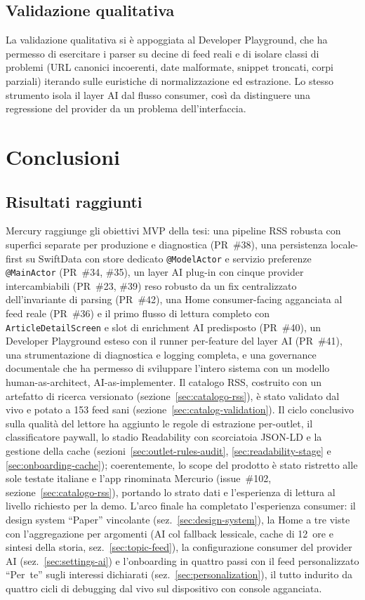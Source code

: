 \section{Validazione qualitativa}
La validazione qualitativa si è appoggiata al Developer Playground, che
ha permesso di esercitare i parser su decine di feed reali e di isolare
classi di problemi (URL canonici incoerenti, date malformate, snippet
troncati, corpi parziali) iterando sulle euristiche di normalizzazione ed
estrazione. Lo stesso strumento isola il layer AI dal flusso consumer,
così da distinguere una regressione del provider da un problema
dell'interfaccia.

\chapter{Conclusioni}
\label{cap:conclusioni}

\section{Risultati raggiunti}
Mercury raggiunge gli obiettivi MVP della tesi: una pipeline RSS robusta con
superfici separate per produzione e diagnostica (PR~\#38), una persistenza
locale-first su SwiftData con store dedicato \texttt{@ModelActor} e servizio
preferenze \texttt{@MainActor} (PR~\#34, \#35), un layer AI plug-in con
cinque provider intercambiabili (PR~\#23, \#39) reso robusto da un fix
centralizzato dell'invariante di parsing (PR~\#42), una Home
consumer-facing agganciata al feed reale (PR~\#36) e il primo flusso di
lettura completo con \texttt{ArticleDetailScreen} e slot di enrichment AI
predisposto (PR~\#40), un Developer Playground esteso con il runner
per-feature del layer AI (PR~\#41), una strumentazione di diagnostica e
logging completa, e una governance documentale che ha permesso di
sviluppare l'intero sistema con un modello human-as-architect,
AI-as-implementer. Il catalogo RSS, costruito con un artefatto di
ricerca versionato (sezione~\ref{sec:catalogo-rss}), è stato validato
dal vivo e potato a 153 feed sani
(sezione~\ref{sec:catalog-validation}). Il ciclo conclusivo sulla
qualità del lettore ha aggiunto le regole di estrazione per-outlet,
il classificatore paywall, lo stadio Readability con scorciatoia
JSON-LD e la gestione della cache
(sezioni~\ref{sec:outlet-rules-audit}, \ref{sec:readability-stage} e
\ref{sec:onboarding-cache}); coerentemente, lo scope del prodotto è
stato ristretto alle sole testate italiane e l'app rinominata
Mercurio (issue~\#102, sezione~\ref{sec:catalogo-rss}), portando lo
strato dati e l'esperienza di lettura al livello richiesto per la
demo. L'arco finale ha completato l'esperienza consumer: il design
system ``Paper'' vincolante (sez.~\ref{sec:design-system}), la Home
a tre viste con l'aggregazione per argomenti (AI col fallback
lessicale, cache di 12~ore e sintesi della storia,
sez.~\ref{sec:topic-feed}), la configurazione consumer del
provider AI (sez.~\ref{sec:settings-ai}) e l'onboarding in quattro
passi con il feed personalizzato ``Per~te'' sugli interessi
dichiarati (sez.~\ref{sec:personalization}), il tutto indurito da
quattro cicli di debugging dal vivo sul dispositivo con console
agganciata.

